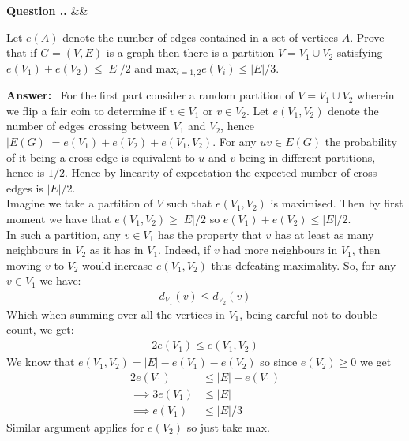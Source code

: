 \documentclass[12pt,a4paper]{report}
\newcounter{question}[chapter]
\renewcommand{\thequestion}{\thechapter.\arabic{question}}
\newenvironment{question}[1][]{%
  \refstepcounter{question}%
  \vspace{1em}%
  \noindent\textbf{Question \thequestion.}%
  \ifx&#1&%
  \else
    \textbf{ #1}%
  \fi
  \textit
  \quad
}{%
  \par\vspace{0.5em}%
}
\newenvironment{answer}{%
  \par\noindent\textbf{Answer:}\ }%
{\par\vspace{1em}}
\begin{document}
\begin{question}
  Let $e(A)$ denote the number of edges contained in a set of vertices $A$. Prove that if $G = (V,E)$ is a graph then there is a partition $V = V_1 \cup V_2$ satisfying $e(V_1) + e(V_2) \leq |E|/2$ and $\text{max}_{i=1,2} e(V_i) \leq |E|/3$.
\end{question}
\begin{answer}
  For the first part consider a random partition of $V = V_1 \cup V_2$ wherein we flip a fair coin to determine if $v \in V_1$ or $v \in V_2$. Let $e(V_1, V_2)$ denote the number of edges crossing between $V_1$ and $V_2$, hence $|E(G)| = e(V_1) + e(V_2) + e(V_1, V_2)$. For any $uv \in E(G)$ the probability of it being a cross edge is equivalent to $u$ and $v$ being in different partitions, hence is $1/2$. Hence by linearity of expectation the expected number of cross edges is $|E|/2$.\\
  Imagine we take a partition of $V$ such that $e(V_1, V_2)$ is maximised. Then by first moment we have that $e(V_1, V_2) \geq |E|/2$ so  $e(V_1) + e(V_2) \leq |E|/2$.\\
  In such a partition, any $v \in V_1$ has the property that $v$ has at least as many neighbours in $V_2$ as it has in $V_1$. Indeed, if $v$ had more neighbours in $V_1$, then moving $v$ to $V_2$ would increase $e(V_1, V_2)$ thus defeating maximality. So, for any $v \in V_1$ we have: 
  \begin{align*}
    d_{V_1}(v) \leq d_{V_2}(v)
  \end{align*}
  Which when summing over all the vertices in $V_1$, being careful not to double count, we get: 
  \begin{align*}
    2e(V_1) \leq e(V_1, V_2)
  \end{align*}
  We know that $e(V_1, V_2) = |E| - e(V_1) - e(V_2)$ so since $e(V_2) \geq 0$ we get
  \begin{align*}
    2e(V_1) &\leq |E| -e(V_1)\\
   \implies 3e(V_1) &\leq |E|\\
    \implies e(V_1) &\leq |E|/3
  \end{align*}
  Similar argument applies for $e(V_2)$ so just take max. 
\end{answer}
\end{document}
